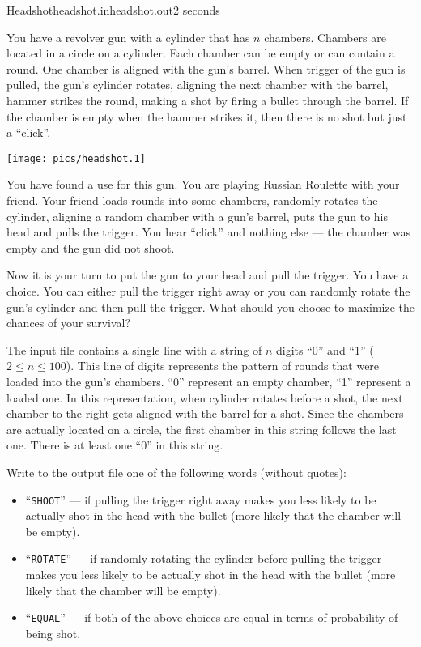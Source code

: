 \begin{problem}{Headshot}{headshot.in}{headshot.out}{2 seconds}


You have a revolver gun with a cylinder that has $n$ chambers. Chambers are located
in a circle on a cylinder. Each chamber can be 
empty or can contain a round. One chamber is aligned with the gun's barrel. When 
trigger of the gun is pulled, the gun's cylinder rotates, aligning the next chamber 
with the barrel, hammer strikes 
the round, making a shot by firing a bullet through the barrel. 
If the chamber is empty when the hammer strikes it, then there is no shot but just a ``click''. 

\begin{center}
\texttt{[image: pics/headshot.1]}
\end{center}

You have found a use for this gun. You are playing Russian Roulette with your friend.
Your friend loads rounds into some chambers, randomly rotates the cylinder, aligning a 
random chamber with a gun's barrel, puts the gun to his head and pulls the trigger. 
You hear ``click'' and nothing else --- the chamber was empty and the gun did not shoot. 

Now it is your turn to put the gun to your head and pull the trigger. 
You have a choice. You can either pull the trigger right away or you can 
randomly rotate the gun's cylinder and then pull the trigger. What
should you choose to maximize the chances of your survival? 

\InputFile

The input file contains a single line with a string of $n$ digits ``0'' and ``1''
($2 \le n \le 100$). This line of digits represents the pattern of rounds that were
loaded into the gun's chambers. ``0'' represent an empty chamber, ``1'' represent 
a loaded one. In this representation, when cylinder rotates before a shot, the
next chamber to the right gets aligned with the barrel for a shot. Since the chambers
are actually located on a circle, the first chamber in this string follows the last one.
There is at least one ``0'' in this string.

\OutputFile

Write to the output file one of the following words (without quotes):
\begin{itemize}
\item ``\texttt{SHOOT}'' --- if pulling the trigger right away makes you less likely to be actually shot
in the head with the bullet (more likely that the chamber will be empty).
\item ``\texttt{ROTATE}'' --- if randomly rotating the cylinder before pulling the trigger makes you 
less likely to be actually shot in the head with the bullet (more likely that the chamber will be empty).
\item ``\texttt{EQUAL}'' --- if both of the above choices are equal in terms of probability of being shot.
\end{itemize}

\Example

\begin{example}
%
%
%
\end{example}

\end{problem}
